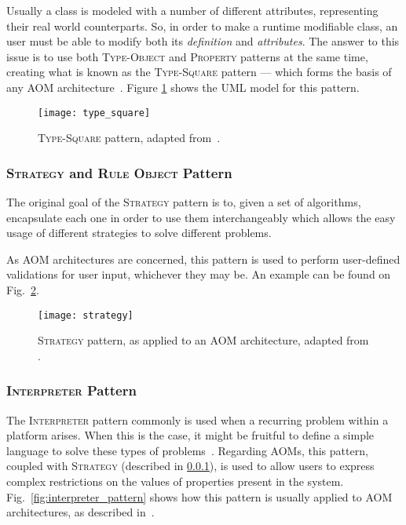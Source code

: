 Usually a class is modeled with a number of different attributes, representing their real world counterparts. So, in order to make a runtime modifiable class, an user must be able to modify both its \emph{definition} and \emph{attributes}. The answer to this issue is to use both \textsc{Type-Object} and \textsc{Property} patterns at the same time, creating what is known as the \textsc{Type-Square} pattern --- which forms the basis of any AOM architecture~\cite{YJ02}. Figure \ref{fig:type_square} shows the UML model for this pattern.

\begin{figure}[H]
  \centering
  \texttt{[image: type\_square]}
  \caption[\textsc{Type-Square}]{\textsc{Type-Square} pattern, adapted from~\cite{YBJ01}.}
  \label{fig:type_square}
\end{figure}

\subsubsection{\textsc{Strategy} and \textsc{Rule Object} Pattern}\label{sec:strategy_pattern}

The original goal of the \textsc{Strategy} pattern is to, given a set of algorithms, encapsulate each one in order to use them interchangeably which allows the easy usage of different strategies to solve different problems\cite{gang_of_four}.

As AOM architectures are concerned, this pattern is used to perform user-defined validations for user input, whichever they may be. An example can be found on Fig.~\ref{fig:strategy_pattern}.

\begin{figure}[H]
  \centering
  \texttt{[image: strategy]}
  \caption[\textsc{Strategy} pattern, as applied to an AOM architecture]{\textsc{Strategy} pattern, as applied to an AOM architecture, adapted from \cite{gang_of_four}.}
  \label{fig:strategy_pattern}
\end{figure}

\subsubsection{\textsc{Interpreter} Pattern}\label{sec:interpreter_pattern}

The \textsc{Interpreter} pattern commonly is used when a recurring problem within a platform arises. When this is the case, it might be fruitful to define a simple language to solve these types of problems~\cite{gang_of_four}. Regarding AOMs, this pattern, coupled with \textsc{Strategy} (described in \ref{sec:strategy_pattern}), is used to allow users to express complex restrictions on the values of properties present in the system. Fig.~\ref{fig:interpreter_pattern} shows how this pattern is usually applied to AOM architectures, as described in~\cite{ferreira_phd_2010}.

